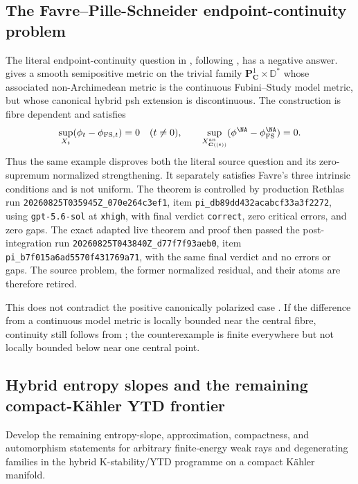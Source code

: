 \subsection{The Favre--Pille-Schneider endpoint-continuity problem}
\label{sec:ch72-hybrid-endpoint-resolved}

The literal endpoint-continuity question in
\cite[Question~3.18]{PS23Hybrid}, following
\cite[Question~1]{Favre20Hybrid}, has a negative answer.
 gives a smooth
semipositive metric on the trivial family
\(\mathbf P^1_{\mathbf C}\times\mathbb D^*\) whose associated
non-Archimedean metric is the continuous Fubini--Study model metric, but
whose canonical hybrid psh extension is discontinuous.  The construction is
fibre dependent and satisfies
\[
 \sup_{X_t}(\phi_t-\phi_{\mathrm{FS},t})=0
 \quad(t\ne0),
 \qquad
 \sup_{X_{\mathbf C((t))}^{\mathrm{an}}}
 (\phi^{\NA}-\phi_{\mathrm{FS}}^{\NA})=0.
\]
Thus the same example disproves both the literal source question and its
zero-supremum normalized strengthening.  It separately satisfies Favre's
three intrinsic conditions and is not uniform.  The theorem is controlled
by production Rethlas run
\nolinkurl{20260825T035945Z_070e264c3ef1}, item
\nolinkurl{pi_db89dd432acabcf33a3f2272}, using
\texttt{gpt-5.6-sol} at \texttt{xhigh}, with final verdict
\texttt{correct}, zero critical errors, and zero gaps.  The exact adapted
live theorem and proof then passed the post-integration run
\nolinkurl{20260825T043840Z_d77f7f93aeb0}, item
\nolinkurl{pi_b7f015a6ad5570f431769a71}, with the same final verdict and no
errors or gaps.  The source problem,
the former normalized residual, and their atoms are therefore retired.

This does not contradict the positive canonically polarized case
\cite[Theorem~5.1]{PS23Hybrid}.  If the difference from a continuous model
metric is locally bounded near the central fibre, continuity still follows
from ; the counterexample is finite
everywhere but not locally bounded below near one central point.

\subsection{Hybrid entropy slopes and the remaining compact-Kähler YTD frontier}
\label{sec:ch72-hybrid-ytd}

\begin{problem}\label{prob:frontier-hybrid-ytd}
Develop the remaining entropy-slope, approximation, compactness, and
automorphism statements for arbitrary finite-energy weak rays and
degenerating families in the hybrid K-stability/YTD programme on a compact
Kähler manifold.
\end{problem}

